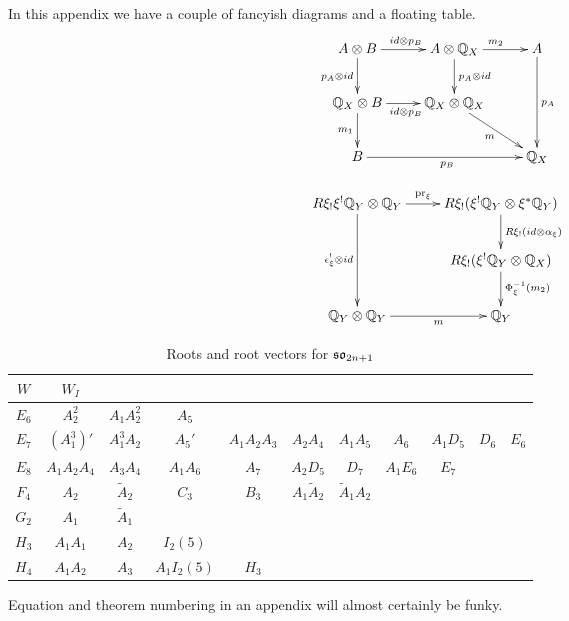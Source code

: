 
In this appendix we have a couple of fancyish diagrams and a floating table.
\[
\xymatrix{A\otimes B \ar[r]^{\id\otimes p_B} \ar[d]_{ p_A\otimes \id} &
  A\otimes \BBQ_X \ar[r]^{m_2} \ar[d]^{p_A\otimes \id} &A
  \ar[dd] ^{p_A} \\
  \BBQ_X\otimes B\ar[r]_{\id\otimes p_B} \ar[d]_{m_1} &\BBQ_X
  \otimes \BBQ_X \ar[rd]_m & \\
  B\ar[rr]_{p_B} &&\BBQ_X}
\]

\[
\xymatrix{R\xi_! \xi^! \BBQ_Y \otimes \BBQ_Y \ar[r]^-{\pr_\xi} \ar[dd]
  _{\epsilon_\xi^! \otimes \id}& R\xi_!( \xi^!
  \BBQ_Y \otimes \xi^* \BBQ_Y ) \ar[d]^{R\xi_!(\id\otimes \alpha_\xi)} \\
  & R\xi_!( \xi^! \BBQ_Y \otimes \BBQ_X ) \ar[d]
  ^{\Phi_\xi\inverse (m_2)} \\
  \BBQ_Y \otimes \BBQ_Y \ar[r]_-{m} &\BBQ_Y }
\]


\begin{table}[h!tb]
  \caption{Roots and root vectors for $\mathfrak {so}_{2n+1}$}\label{atab:soodd}
  \begin{tabular}{c|cccccccccc}
    $W$ & $W_I$ \\
    \hline
    \hline
    $E_6$ & $A_2^2$ & $A_1 A_2^2$ & $A_5$ \\
    $E_7$ &  $(A_1^3)'$ & $A_1^3 A_2$ & $A_5'$ & $A_1 A_2
    A_3$ & $A_2 A_4$ & $A_1 A_5$ &  $A_6$ & $A_1 D_5$ & $D_6$ &
    $E_6$ \\ 
    $E_8$ &  $A_1 A_2 A_4$ & $A_3 A_4$ & $A_1 A_6$ & $A_7$ & $A_2 D_5$ &
    $D_7$ & $A_1 E_6$ & $E_7$ \\ 
    $F_4$ &  $A_2$ & $\widetilde A_2$ & $C_3$ & $B_3$ & $A_1 \widetilde
    A_2$ & $\widetilde A_1 A_2$  \\ 
    $G_2$ & $A_1$ & $\widetilde A_1$ \\
    $H_3$ & $A_1A_1$ & $A_2$ &$I_2(5)$ \\
    $H_4$ & $A_1A_2$ & $A_3$ &$A_1I_2(5)$ &$H_3$\\
  \end{tabular}
\end{table}

Equation and theorem numbering in an appendix will almost certainly be
funky.


